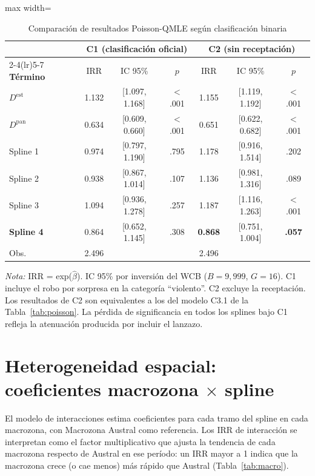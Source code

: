\documentclass[12pt,a4paper]{article}
\newcommand{\tablenote}[1]{%
  \vspace{2pt}%
  \begin{minipage}{\linewidth}%
    \footnotesize\textit{Nota:} #1%
  \end{minipage}%
}
\begin{document}
\begin{table}[H]
\centering
\caption{Comparaci\'on de resultados Poisson-QMLE seg\'un clasificaci\'on binaria}
\label{tab:clasif}
\footnotesize
\begin{adjustbox}{max width=\columnwidth}
\begin{tabular}{l@{\hskip 3mm}ccc@{\hskip 4mm}ccc}
\toprule
 & \multicolumn{3}{c}{\textbf{C1 (clasificaci\'on oficial)}} &
   \multicolumn{3}{c}{\textbf{C2 (sin receptaci\'on)}} \\
\cmidrule(lr){2-4}\cmidrule(lr){5-7}
\textbf{T\'ermino} & IRR & IC 95\% & $p$ & IRR & IC 95\% & $p$ \\
\midrule
$D^{\text{est}}$ & 1.132 & [1.097, 1.168] & $<$.001 & 1.155 & [1.119, 1.192] & $<$.001 \\
$D^{\text{pan}}$ & 0.634 & [0.609, 0.660] & $<$.001 & 0.651 & [0.622, 0.682] & $<$.001 \\
\midrule
Spline 1 & 0.974 & [0.797, 1.190] & .795 & 1.178 & [0.916, 1.514] & .202 \\
Spline 2 & 0.938 & [0.867, 1.014] & .107 & 1.136 & [0.981, 1.316] & .089 \\
Spline 3 & 1.094 & [0.936, 1.278] & .257 & 1.187 & [1.116, 1.263] & $<$.001 \\
\textbf{Spline 4} & 0.864 & [0.652, 1.145] & .308 & \textbf{0.868} & [0.751, 1.004] & \textbf{.057} \\
\midrule
Obs. & 2.496 & & & 2.496 & & \\
\bottomrule
\end{tabular}
\end{adjustbox}
\tablenote{IRR = exp($\hat{\beta}$). IC 95\% por inversi\'on del WCB ($B=9{,}999$,
$G=16$). C1 incluye el robo por sorpresa en la categor\'ia ``violento''. C2 excluye la receptaci\'on.
Los resultados de C2 son equivalentes a los del modelo C3.1 de la
Tabla~\ref{tab:poisson}. La p\'erdida de significancia en todos los splines bajo C1
refleja la atenuaci\'on producida por incluir el lanzazo.}
\end{table}

\section{Heterogeneidad espacial: coeficientes macrozona $\times$ spline}
\label{ap:macro}

El modelo de interacciones estima coeficientes para cada tramo del spline en cada
macrozona, con Macrozona Austral como referencia. Los IRR de interacci\'on se
interpretan como el factor multiplicativo que ajusta la tendencia de cada macrozona
respecto de Austral en ese per\'iodo: un IRR mayor a 1 indica que la macrozona crece
(o cae menos) m\'as r\'apido que Austral (Tabla~\ref{tab:macro}).
\end{document}
